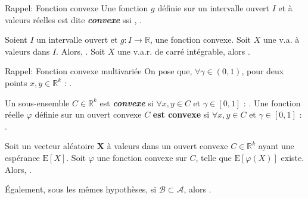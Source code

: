 \documentclass[10pt, french]{report}
\begin{document}
\begin{multicols*}{2}
\begin{definitionNOHFILL}
\begin{rappel}{Rappel: Fonction convexe}
Une fonction $g$ définie sur un intervalle ouvert $I$ et à valeurs réelles est dite \textbf{\textit{convexe}} ssi , .
\end{rappel}

Soient $I$ un intervalle ouvert et $g : I \rightarrow \mathbb{R}$, une fonction convexe. Soit $X$ une v.a. à valeurs dans $I$. Alors, .
Soit $X$ une v.a.r. de carré intégrable, alors  .
\end{definitionNOHFILL}


\begin{definitionNOHFILL}
\begin{rappel}{Rappel: Fonction convexe multivariée}
On pose que, $\forall \gamma \in (0, 1)$, pour deux points $x, y \in \mathbb{R}^{k}$ : . 

\bigskip

Un sous-ensemble $C \in \mathbb{R}^{k}$ est \textbf{\textit{convexe}} si $\forall x, y \in C$ et $\gamma \in [0, 1]$ : . Une fonction réelle $\varphi$ définie sur un ouvert convexe $C$ \textbf{est convexe} si $\forall x, y \in C$ et $\gamma \in [0, 1]$ : .
\end{rappel}

Soit un vecteur aléatoire $\bm{X}$ à valeurs dans un ouvert convexe $C \in \mathbb{R}^{k}$ ayant une espérance $\text{E}[X]$. Soit $\varphi$ une fonction convexe sur $C$, telle que $\text{E}[\varphi(X)]$ existe. Alors, .

\bigskip

Également, sous les mêmes hypothèses, si $\mathcal{B} \subset \mathcal{A}$, alors .
\end{definitionNOHFILL}


\end{multicols*}
\end{document}
